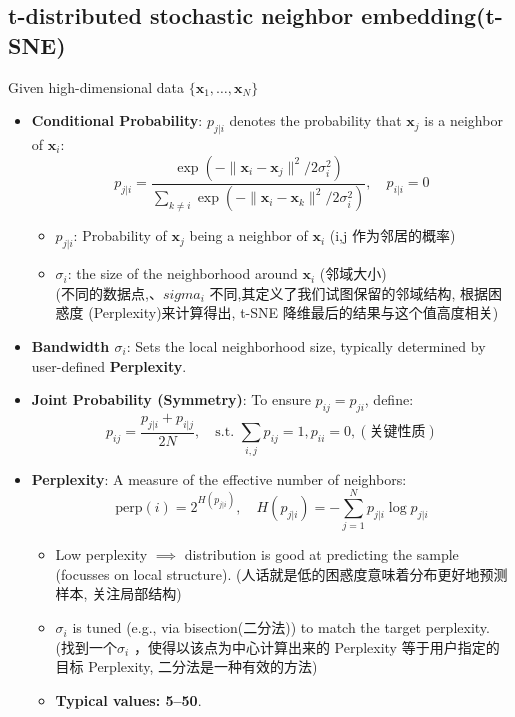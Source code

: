\documentclass[UTF8]{ctexart}
\begin{document}
\subsection{t-distributed stochastic neighbor embedding(t-SNE)}
Given high-dimensional data $\{\mathbf{x}_1, \dots, \mathbf{x}_N\}$
\begin{itemize}
    \item \textbf{Conditional Probability}: $p_{j|i}$ denotes the probability that $\mathbf{x}_j$ is a neighbor of $\mathbf{x}_i$:
    $$p_{j|i} = \frac{\exp(-\|\mathbf{x}_i - \mathbf{x}_j\|^2 / 2\sigma_i^2)}{\sum_{k \neq i} \exp(-\|\mathbf{x}_i - \mathbf{x}_k\|^2 / 2\sigma_i^2)}, \quad p_{i|i} = 0$$
    \begin{itemize}
        \item $p_{j|i}$: Probability of $\mathbf{x}_j$ being a neighbor of $\mathbf{x}_i$ (i,j 作为邻居的概率)
        \item $\sigma_i$: the size of the neighborhood around $\mathbf{x}_i$ (邻域大小)\\
        (不同的数据点,$、sigma_i$ 不同,其定义了我们试图保留的邻域结构, 根据困惑度 (Perplexity)来计算得出, t-SNE 降维最后的结果与这个值高度相关)
    \end{itemize}
    \item \textbf{Bandwidth $\sigma_i$}: Sets the local neighborhood size, typically determined by user-defined \textbf{Perplexity}.
    \item \textbf{Joint Probability (Symmetry)}: To ensure $p_{ij} = p_{ji}$, define:
    $$p_{ij} = \frac{p_{j|i} + p_{i|j}}{2N}, \quad \text{s.t. } \sum_{i,j} p_{ij} = 1, p_{ii} = 0,(关键性质)$$
    \item \textbf{Perplexity}: A measure of the effective number of neighbors:
    $$\text{perp}(i) = 2^{H(p_{j|i})}, \quad H(p_{j|i}) = -\sum_{j=1}^N p_{j|i} \log p_{j|i}$$
    \begin{itemize}
        \item Low perplexity $\implies$ distribution is good at predicting the sample (focusses on local structure).
        (人话就是低的困惑度意味着分布更好地预测样本, 关注局部结构)
        \item $\sigma_i$ is tuned (e.g., via bisection(二分法)) to match the target perplexity.
        (找到一个$\sigma_i$ ，使得以该点为中心计算出来的 Perplexity 等于用户指定的目标 Perplexity, 二分法是一种有效的方法)
        \item \textbf{Typical values: 5--50}.
    \end{itemize}
    

\end{itemize}
\end{document}
